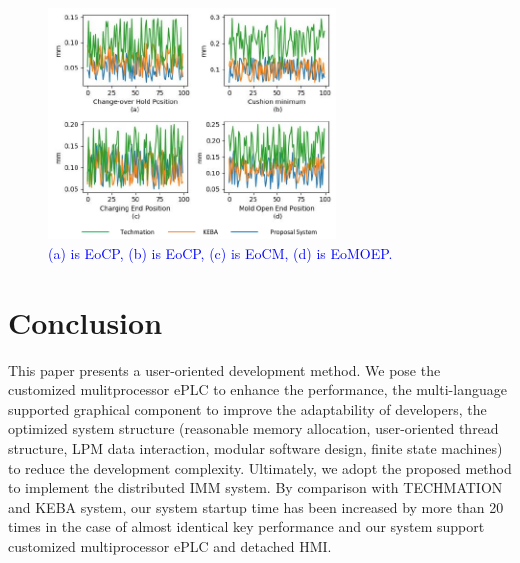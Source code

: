 \documentclass[journal,UTF8]{IEEEtran}
\begin{document}
\begin{figure}
	\centering
	\includegraphics[width=3in]{fig/Compare.pdf}
	\caption{\textcolor{blue}{(a) is EoCP, (b) is EoCP, (c) is EoCM, (d) is EoMOEP.}}
	\label{fig:Compare}
\end{figure}
\section{Conclusion}
\label{conclusion}
This paper presents a user-oriented development method. We pose the customized mulitprocessor ePLC to enhance the performance, the multi-language supported graphical component to improve the adaptability of developers, the optimized system structure (reasonable memory allocation, user-oriented thread structure, LPM data interaction, modular software design, finite state machines) to reduce the development complexity. Ultimately, we adopt the proposed method to implement the distributed IMM system. By comparison with TECHMATION and KEBA system, our system startup time has been increased by more than 20 times in the case of almost identical key performance and our system support customized multiprocessor ePLC and detached HMI.





\ifCLASSOPTIONcaptionsoff
  \newpage
\fi





%
%
%
\end{document}
